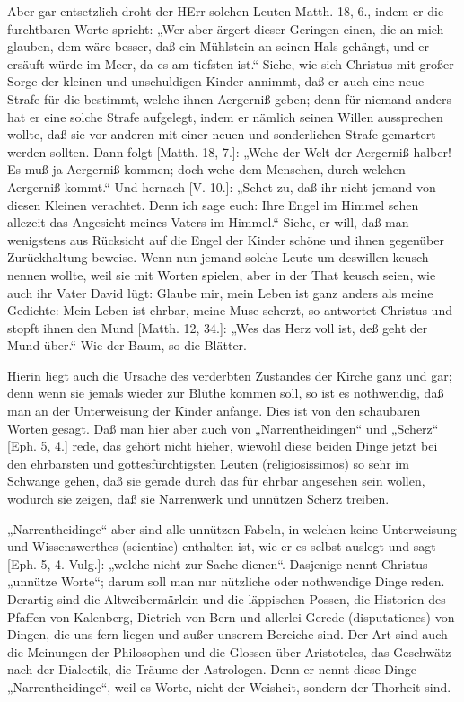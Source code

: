 Aber gar entsetzlich droht der HErr solchen Leuten Matth. 18, 6., indem er die furchtbaren Worte spricht: „Wer aber ärgert dieser Geringen einen, die an mich glauben, dem wäre besser, daß ein Mühlstein an seinen Hals gehängt, und er ersäuft würde im Meer, da es am tiefsten ist.“ Siehe, wie sich Christus mit großer Sorge der kleinen und unschuldigen Kinder annimmt, daß er auch eine neue Strafe für die bestimmt, welche ihnen Aergerniß geben; denn für niemand anders hat er eine solche Strafe aufgelegt, indem er nämlich seinen Willen aussprechen wollte, daß sie vor anderen mit einer neuen und sonderlichen Strafe gemartert werden sollten. Dann folgt [Matth. 18, 7.]: „Wehe der Welt der Aergerniß halber! Es muß ja Aergerniß kommen; doch wehe dem Menschen, durch welchen Aergerniß kommt.“ Und hernach [V. 10.]: „Sehet zu, daß ihr nicht jemand von diesen Kleinen verachtet. Denn ich sage euch: Ihre Engel im Himmel sehen allezeit das Angesicht meines
Vaters im Himmel.“ Siehe, er will, daß man wenigstens aus Rücksicht auf die Engel der Kinder schöne und ihnen gegenüber Zurückhaltung beweise. Wenn nun jemand solche Leute um deswillen keusch nennen wollte, weil sie mit Worten spielen, aber in der That keusch seien, wie auch ihr Vater David lügt: Glaube mir, mein Leben ist ganz anders als meine Gedichte: Mein Leben ist ehrbar, meine Muse scherzt, so antwortet Christus und stopft ihnen den Mund [Matth. 12, 34.]: „Wes das Herz voll ist, deß geht der Mund über.“ Wie der Baum, so die Blätter.

Hierin liegt auch die Ursache des verderbten Zustandes der Kirche ganz und gar; denn wenn sie jemals wieder zur Blüthe kommen soll, so ist es nothwendig, daß man an der Unterweisung der Kinder anfange. Dies ist von den schaubaren Worten gesagt. Daß man hier aber auch von „Narrentheidingen“ und „Scherz“ [Eph. 5, 4.] rede, das gehört nicht hieher, wiewohl diese beiden Dinge jetzt bei den ehrbarsten und gottesfürchtigsten Leuten (religiosissimos) so sehr im Schwange gehen, daß sie gerade durch das für ehrbar angesehen sein wollen, wodurch sie zeigen, daß sie Narrenwerk und unnützen Scherz treiben.

„Narrentheidinge“ aber sind alle unnützen Fabeln, in welchen keine Unterweisung und Wissenswerthes (scientiae) enthalten ist, wie er es selbst auslegt und sagt [Eph. 5, 4. Vulg.]: „welche nicht zur Sache dienen“. Dasjenige nennt Christus „unnütze Worte“; darum soll man nur nützliche oder nothwendige Dinge reden. Derartig sind die Altweibermärlein und die läppischen Possen, die Historien des Pfaffen von Kalenberg, Dietrich von Bern und allerlei Gerede (disputationes) von Dingen, die uns fern liegen und außer unserem Bereiche sind. Der Art sind auch die Meinungen der Philosophen und die Glossen über Aristoteles, das Geschwätz nach der Dialectik, die Träume der Astrologen. Denn er nennt diese Dinge „Narrentheidinge“, weil es Worte, nicht der Weisheit, sondern der Thorheit sind.


